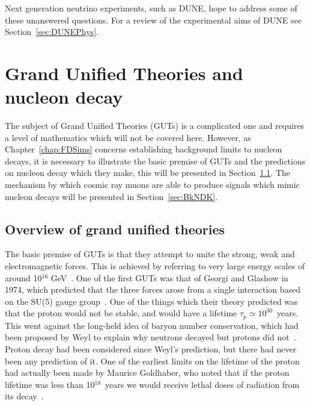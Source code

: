 Next generation neutrino experiments, such as DUNE, hope to address some of these unanswered questions. For a review of the experimental aims of DUNE see Section~\ref{sec:DUNEPhys}. \\

\section{Grand Unified Theories and nucleon decay}  \label{sec:Theory_GUT} %
The subject of Grand Unified Theories (GUTs) is a complicated one and requires a level of mathematics which will not be covered here. However, as Chapter~\ref{chap:FDSims} concerns establishing background limits to nucleon decays, it is necessary to illustrate the basic premise of GUTs and the predictions on nucleon decay which they make, this will be presented in Section~\ref{sec:Theory_NDK}. The mechanism by which cosmic ray muons are able to produce signals which mimic nucleon decays will be presented in Section~\ref{sec:BkNDK}.\\

\subsection{Overview of grand unified theories} \label{sec:Theory_NDK}  %
The basic premise of GUTs is that they attempt to unite the strong, weak and electromagnetic forces. This is achieved by referring to very large energy scales of around 10$^{16}$ GeV~\citep{PhysRevD.25.3092}. One of the first GUTs was that of Georgi and Glashow in 1974, which predicted that the three forces arose from a single interaction based on the SU(5) gauge group~\citep{PhysRevLett.32.438}. One of the things which their theory predicted was that the proton would not be stable, and would have a lifetime $\tau_{p} \simeq 10^{30}$~years. This went against the long-held idea of baryon number conservation, which had been proposed by Weyl to explain why neutrons decayed but protons did not~\citep{Weyl1929}. Proton decay had been considered since Weyl's prediction, but there had never been any prediction of it. One of the earliest limits on the lifetime of the proton had actually been made by Maurice Goldhaber, who noted that if the proton lifetime was less than 10$^{18}$~years we would receive lethal doses of radiation from its decay~\citep{Senjanovic:2009kr}. \\

